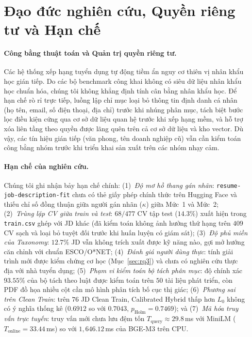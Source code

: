 \section{Đạo đức nghiên cứu, Quyền riêng tư và Hạn chế}

\paragraph{Công bằng thuật toán và Quản trị quyền riêng tư.}
Các hệ thống xếp hạng tuyển dụng tự động tiềm ẩn nguy cơ thiên vị nhân khẩu học gián tiếp. Do các bộ benchmark công khai không có siêu dữ liệu nhân khẩu học chuẩn hóa, chúng tôi không khẳng định tính cân bằng nhân khẩu học. Để hạn chế rò rỉ trực tiếp, luồng lập chỉ mục loại bỏ thông tin định danh cá nhân (họ tên, email, số điện thoại, địa chỉ) trước khi nhúng phân mục, tách biệt bước lọc điều kiện cứng qua cơ sở dữ liệu quan hệ trước khi xếp hạng mềm, và hỗ trợ xóa liên tầng theo quyền được lãng quên trên cả cơ sở dữ liệu và kho vector. Dù vậy, các tín hiệu gián tiếp (văn phong, tên doanh nghiệp cũ) vẫn cần kiểm toán công bằng nhóm trước khi triển khai sản xuất trên các nhóm nhạy cảm.

\paragraph{Hạn chế của nghiên cứu.}
Chúng tôi ghi nhận bảy hạn chế chính:
(1)~\textit{Độ mơ hồ thang gán nhãn}: \texttt{resume-job-description-fit} chưa có thẻ giấy phép chính thức trên Hugging Face và thiếu chỉ số đồng thuận giữa người gán nhãn ($\kappa$) giữa Mức~1 và Mức~2;
(2)~\textit{Trùng lặp CV giữa train và test}: $68/477$ CV tập test ($14.3\%$) xuất hiện trong \texttt{train.csv} ghép với JD khác (đã kiểm toán không ảnh hưởng thứ hạng trên $409$ CV sạch và loại bỏ tuyệt đối trước khi huấn luyện có giám sát);
(3)~\textit{Độ phủ miền của Taxonomy}: $12.7\%$ JD vẫn không trích xuất được kỹ năng nào, gợi mở hướng căn chỉnh với chuẩn ESCO/O*NET;
(4)~\textit{Đánh giá người dùng thực}: tính giải trình mới được kiểm chứng cơ học (Mục~\ref{sec:rq3}) và chưa có nghiên cứu thực địa với nhà tuyển dụng;
(5)~\textit{Phạm vi kiểm toán bộ tách phân mục}: độ chính xác $93.55\%$ của bộ tách theo luật được kiểm toán trên $50$ tài liệu phát triển, còn PDF đồ họa nhiều cột cần mô hình phân tích bố cục thị giác;
(6)~\textit{Phương sai trên Clean Train}: trên $76$ JD Clean Train, Calibrated Hybrid thấp hơn $L_0$ không có ý nghĩa thống kê ($0.6912$ so với $0.7043$, $p_{\text{Holm}}=0.7469$); và
(7)~\textit{Mã hóa truy vấn trực tuyến}: truy vấn mới chưa lưu đệm tốn $T_{\text{query}} \approx 29.8$\,ms với MiniLM ($T_{\text{online}}=33.44$\,ms) so với $1{,}646.12$\,ms của BGE-M3 trên CPU.
